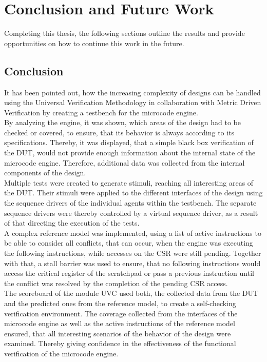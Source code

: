 \section{Conclusion and Future Work}

Completing this thesis, the following sections outline the results and provide opportunities on how to continue this work in the future.

\subsection{Conclusion}

It has been pointed out, how the increasing complexity of designs can be handled using the Universal Verification Methodology in collaboration with Metric
Driven Verification by creating a testbench for the microcode engine.\\
By analyzing the engine, it was shown, which areas of the design had to be checked or covered, to ensure, that its behavior is always according to its
specifications.
Thereby, it was displayed, that a simple black box verification of the DUT, would not provide enough information about the internal state of the microcode
engine. Therefore, additional data was collected from the internal components of the design.\\
Multiple tests were created to generate stimuli, reaching all interesting areas of the DUT.
Their stimuli were applied to the different interfaces of the design using the sequence drivers of the individual agents within the testbench.
The separate sequence drivers were thereby controlled by a virtual sequence driver, as a result of that directing the execution of the tests.\\
A complex reference model was implemented, using a list of active instructions to be able to consider all conflicts, that can occur, when the engine was
executing the following instructions, while accesses on the CSR were still pending. Together with that, a stall barrier was used to ensure, that no following
instructions would access the critical register of the scratchpad or pass a previous instruction until the conflict was resolved by the completion of the
pending CSR access. \\
The scoreboard of the module UVC used both, the collected data from the DUT and the predicted ones from the reference model, to create a
self-checking verification environment.
The coverage collected from the interfaces of the microcode engine as well as the active instructions of the reference model ensured, that all interesting
scenarios of the behavior of the design were examined. Thereby giving confidence in the effectiveness of the functional verification of the microcode engine.


